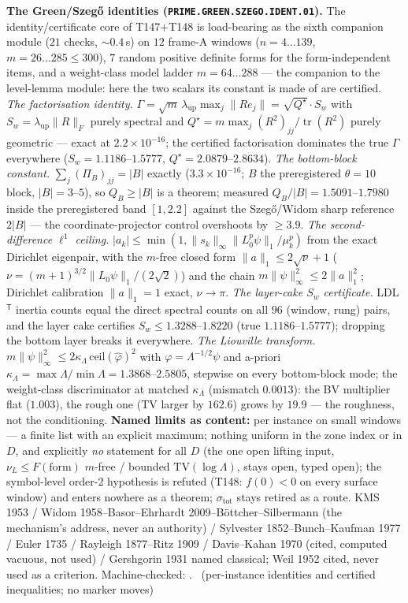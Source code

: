 \documentclass[11pt,a4paper]{article}
\theoremstyle{definition}
\begin{document}
\par\smallskip\noindent\textbf{The Green/Szeg\H{o} identities
(\texttt{PRIME.GREEN.SZEGO.IDENT.01}).}
The identity/certificate core of T147+T148 is load-bearing as the sixth
companion module ($21$ checks, ${\sim}0.4$\,s) on $12$ frame-A windows
($n=4\ldots139$, $m=26\ldots285\le300$), $7$ random positive definite forms
for the form-independent items, and a weight-class model ladder
$m=64\ldots288$ --- the companion to the level-lemma module: here the two
scalars its constant is made of are certified.
\emph{The factorisation identity.}
$\Gamma=\sqrt m\,\lambda_{\mathrm{up}}\max_j\|Re_j\|=\sqrt{Q^\star}\cdot S_w$
with $S_w=\lambda_{\mathrm{up}}\|R\|_F$ purely spectral and
$Q^\star=m\max_j(R^2)_{jj}/\operatorname{tr}(R^2)$ purely geometric ---
exact at $2.2\times10^{-16}$; the certified factorisation dominates the true
$\Gamma$ everywhere ($S_w=1.1186$--$1.5777$, $Q^\star=2.0879$--$2.8634$).
\emph{The bottom-block constant.} $\sum_j(\Pi_B)_{jj}=|B|$ exactly
($3.3\times10^{-16}$; $B$ the preregistered $\theta=10$ block, $|B|=3$--$5$),
so $Q_B\ge|B|$ is a theorem; measured $Q_B/|B|=1.5091$--$1.7980$ inside the
preregistered band $[1,2.2]$ against the Szeg\H{o}/Widom sharp reference
$2|B|$ --- the coordinate-projector control overshoots by $\ge3.9$.
\emph{The second-difference $\ell^1$ ceiling.}
$|a_k|\le\min(1,\|s_k\|_\infty\|L_0^p\psi\|_1/\mu_k^p)$ from the exact
Dirichlet eigenpair, with the $m$-free closed form $\|a\|_1\le2\sqrt\nu+1$
($\nu=(m+1)^{3/2}\|L_0\psi\|_1/(2\sqrt2)$) and the chain
$m\|\psi\|_\infty^2\le2\|a\|_1^2$; Dirichlet calibration $\|a\|_1=1$ exact,
$\nu\to\pi$.
\emph{The layer-cake $S_w$ certificate.} LDL$^{\mathsf T}$ inertia counts
equal the direct spectral counts on all $96$ (window, rung) pairs, and the
layer cake certifies $S_w\le1.3288$--$1.8220$ (true $1.1186$--$1.5777$);
dropping the bottom layer breaks it everywhere.
\emph{The Liouville transform.}
$m\|\psi\|_\infty^2\le2\kappa_\Lambda\,\mathrm{ceil}(\hat\varphi)^2$ with
$\varphi=\Lambda^{-1/2}\psi$ and a-priori
$\kappa_\Lambda=\max\Lambda/\min\Lambda=1.3868$--$2.5805$, stepwise on every
bottom-block mode; the weight-class discriminator at matched $\kappa_\Lambda$
(mismatch $0.0013$): the BV multiplier flat ($1.003$), the rough one
($\mathrm{TV}$ larger by $162.6$) grows by $19.9$ --- the roughness, not the
conditioning.
\textbf{Named limits as content:} per instance on small windows --- a finite
list with an explicit maximum; nothing uniform in the zone index or in $D$,
and explicitly \emph{no} statement for all $D$ (the one open lifting input,
$\nu_L\le F(\text{form})$ $m$-free / bounded $\mathrm{TV}(\log\Lambda)$,
stays open, typed open); the symbol-level order-2 hypothesis is refuted
(T148: $f(0)<0$ on every surface window) and enters nowhere as a theorem;
$\sigma_{\mathrm{tot}}$ stays retired as a route.
KMS 1953 / Widom 1958--Basor--Ehrhardt 2009--B\"ottcher--Silbermann (the
mechanism's address, never an authority) / Sylvester 1852--Bunch--Kaufman
1977 / Euler 1735 / Rayleigh 1877--Ritz 1909 / Davis--Kahan 1970 (cited,
computed vacuous, not used) / Gershgorin 1931 named classical; Weil 1952
cited, never used as a criterion.
Machine-checked:
.
\mE\ (per-instance identities and certified inequalities; no marker moves)
\end{document}
